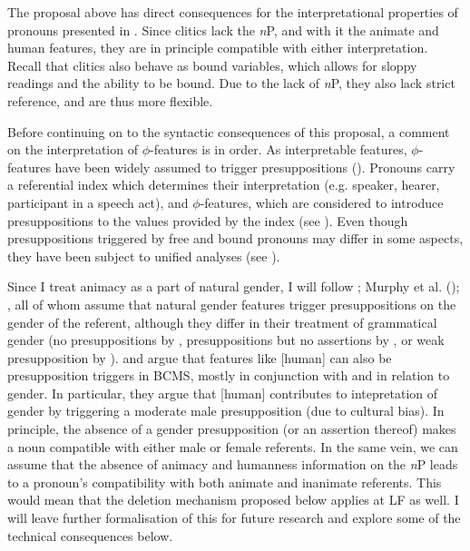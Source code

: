 \documentclass[output=paper,colorlinks,citecolor=brown]{langscibook}
\begin{document}
The proposal above has direct consequences for the interpretational properties of pronouns presented in . Since clitics lack the \textit{n}P, and with it the animate and human features, they are in principle compatible with either interpretation. Recall that clitics also behave as bound variables, which allows for sloppy readings and the ability to be bound. Due to the lack of \textit{n}P, they also lack strict reference, and are thus more flexible. 

Before continuing on to the syntactic consequences of this proposal, a comment on the interpretation of $\phi$-features is in order. As interpretable features, $\phi$-features have been widely assumed to trigger presuppositions (\citealt{cooper83,heim08,kratzer09,jacobson12,sudo-diss}). Pronouns carry a referential index which determines their interpretation (e.g. speaker, hearer, participant in a speech act), and $\phi$-features, which are considered to introduce presuppositions to the values provided by the index (see \citealt{sauerland13}). Even though presuppositions triggered by free and bound pronouns may differ in some aspects, they have been subject to unified analyses (see \citealt{sudo-diss,sauerland13}). 

Since I treat animacy as a part of natural gender, I will follow \citet{merchant14}; Murphy et al. (\citeyear{murphyetal-fdslexperiment}); \citet{sudospathas20,arsenijevic21}, all of whom assume that natural gender features trigger presuppositions on the gender of the referent, although they differ in their treatment of grammatical gender (no presuppositions by \citealt{merchant14,murphyetal-fdslexperiment}, presuppositions but no assertions by \citealt{sudospathas20}, or weak presupposition by  \citealt{arsenijevic21}). \citet{arsenijevic21} and \citet{arsenijevicetalhybrid} argue that features like [human] can also be presupposition triggers in BCMS, mostly in conjunction with and in relation to gender. In particular, they argue that [human] contributes to intepretation of gender by triggering a moderate male presupposition (due to cultural bias). In principle, the absence of a gender presupposition (or an assertion thereof) makes a noun compatible with either male or female referents. In the same vein, we can assume that the absence of animacy and humanness information on the \textit{n}P leads to a pronoun's compatibility with both animate and inanimate referents. This would mean that the deletion mechanism proposed below  applies at LF as well. I will leave further formalisation of this for future research and explore some of the technical consequences below.
\end{document}
